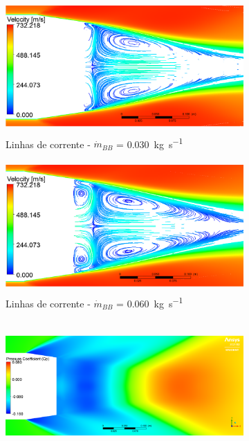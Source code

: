 \begin{figure}
    \centering
    \begin{subfigure}[b]{0.47\textwidth} %
        \centering
        \includegraphics[height=5cm,width=\textwidth]{corrente-velocidade-2306K-vazao-0030-2pol.png}
        \caption{Linhas de corrente - \(\Dot{m}_{BB}\) = \qty{0,030}{\kilogram\per\second}}
        \label{fig:corrente-velocidade-bb-2pol-vazao0030}
    \end{subfigure}
    \hfill
    \begin{subfigure}[b]{0.47\textwidth} %
        \centering
        \includegraphics[height=5cm,width=\textwidth]{corrente-velocidade-2306K-vazao-0060-2pol.png}
        \caption{Linhas de corrente - \(\Dot{m}_{BB}\) = \qty{0,060}{\kilogram\per\second}}
        \label{fig:corrente-velocidade-bb-2pol-vazao0060}
    \end{subfigure}
    \hfill
    \begin{subfigure}[b]{0.47\textwidth} %
        \centering
        \includegraphics[height=5cm,width=\textwidth]{coeficientepressao-vazao0030-temp2306-diam2pol.png}

\end{subfigure}
\end{figure}
